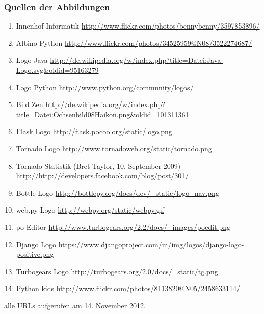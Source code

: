 \documentclass[
    t,
    smaller,
    compress,
    xcolor=svgnames,            %
    table,
]{beamer}
\begin{document}
\begin{frame}
  \frametitle{Quellen der Abbildungen}
  \footnotesize
  \begin{enumerate}[<1->]
    \item Innenhof Informatik
        \url{http://www.flickr.com/photos/bennybenny/3597853896/}       \label{illu:1}
    \item Albino Python
        \url{http://www.flickr.com/photos/34525959@N08/3522274687/}
        \label{illu:13}
    \item Logo Java
      \url{http://de.wikipedia.org/w/index.php?title=Datei:Java-Logo.svg&oldid=95163279}
      \label{illu:2}
    \item Logo Python
      \url{http://www.python.org/community/logos/}
      \label{illu:12}
    \item Bild Zen
      \url{http://de.wikipedia.org/w/index.php?title=Datei:Ochsenbild08Haikon.png&oldid=101311361}
      \label{illu:11}

   \item Flask Logo
        \url{http://flask.pocoo.org/static/logo.png}                    \label{illu:3}

    \item Tornado Logo
                \url{http://www.tornadoweb.org/static/tornado.png}              \label{illu:4}

    \item Tornado Statistik (Bret Taylor, 10. September 2009)
        \url{http://http://developers.facebook.com/blog/post/301/}      \label{illu:5}

    \item Bottle Logo
        \url{http://bottlepy.org/docs/dev/_static/logo_nav.png}             \label{illu:6}

    \item web.py Logo
        \url{http://webpy.org/static/webpy.gif}             \label{illu:7}
     \item po-Editor
        \url{http://www.turbogears.org/2.2/docs/_images/poedit.png}     \label{illu:8}
\item Django Logo
        \url{https://www.djangoproject.com/m/img/logos/django-logo-positive.png  }
\label{illu:9}
\item Turbogears Logo
        \url{http://turbogears.org/2.0/docs/_static/tg.png}
\label{illu:10}
    \item Python kids
        \url{http://www.flickr.com/photos/8113820@N05/2458633114/}
        \label{illu:14}
  \end{enumerate}
  alle URLs aufgerufen am 14. November 2012.
\end{frame}
\end{document}
